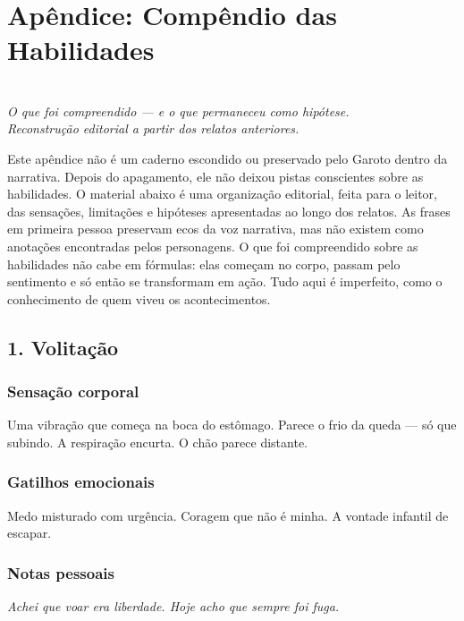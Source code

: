 \newpage
\ifdefined\useChapters
\chapter*{Apêndice: Compêndio das Habilidades}
\else
\chapter*{}
\fi

\begin{center}
\textit{O que foi compreendido — e o que permaneceu como hipótese.\\
Reconstrução editorial a partir dos relatos anteriores.}
\end{center}

\bigskip

Este apêndice não é um caderno escondido ou preservado pelo Garoto dentro da narrativa. Depois do apagamento, ele não deixou pistas conscientes sobre as habilidades. O material abaixo é uma organização editorial, feita para o leitor, das sensações, limitações e hipóteses apresentadas ao longo dos relatos. As frases em primeira pessoa preservam ecos da voz narrativa, mas não existem como anotações encontradas pelos personagens. O que foi compreendido sobre as habilidades não cabe em fórmulas: elas começam no corpo, passam pelo sentimento e só então se transformam em ação. Tudo aqui é imperfeito, como o conhecimento de quem viveu os acontecimentos.

\section*{1. Volitação}

\subsection*{Sensação corporal}
Uma vibração que começa na boca do estômago.  
Parece o frio da queda — só que subindo.  
A respiração encurta. O chão parece distante.

\subsection*{Gatilhos emocionais}
Medo misturado com urgência.  
Coragem que não é minha.  
A vontade infantil de escapar.

\subsection*{Notas pessoais}
\textit{Achei que voar era liberdade.  
Hoje acho que sempre foi fuga.}

